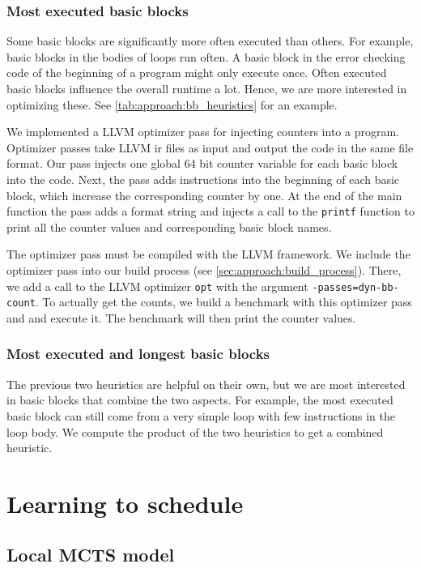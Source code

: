 \subsubsection{Most executed basic blocks}
Some basic blocks are significantly more often executed than others.
For example, basic blocks in the bodies of loops run often.
A basic block in the error checking code of the beginning of a program might only execute once.
Often executed basic blocks influence the overall runtime a lot.
Hence, we are more interested in optimizing these.
See \cref{tab:approach:bb_heuristics} for an example.

We implemented a LLVM optimizer pass for injecting counters into a program.
Optimizer passes take LLVM \ac{ir} files as input and output the code in the same file format.
Our pass injects one global 64 bit counter variable for each basic block into the code.
Next, the pass adds instructions into the beginning of each basic block, which increase the corresponding counter by one.
At the end of the main function the pass adds a format string and injects a call to the \lstinline{printf} function to print all the counter values and corresponding basic block names.

The optimizer pass must be compiled with the LLVM framework.
We include the optimizer pass into our build process (see \cref{sec:approach:build_process}).
There, we add a call to the LLVM optimizer \lstinline{opt} with the argument \mbox{\lstinline{-passes=dyn-bb-count}}.
To actually get the counts, we build a benchmark with this optimizer pass and and execute it.
The benchmark will then print the counter values.

\subsubsection{Most executed and longest basic blocks}
The previous two heuristics are helpful on their own, but we are most interested in basic blocks that combine the two aspects.
For example, the most executed basic block can still come from a very simple loop with few instructions in the loop body.
We compute the product of the two heuristics to get a combined heuristic.

\section{Learning to schedule}
\label{sec:approach:ml}
\subsection{Local MCTS model}
\label{subsec:approach:ml:mcts}
